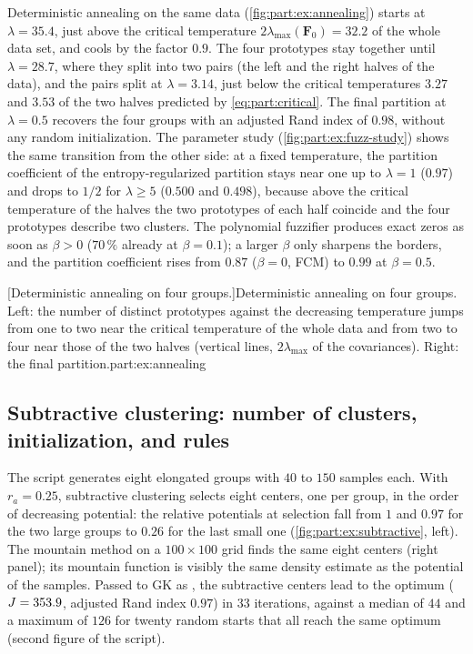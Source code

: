 Deterministic annealing on the same data (\cref{fig:part:ex:annealing}) starts at $\lambda=35.4$, just above the critical temperature $2\lambda_{\max}(\mathbf{F}_0)=32.2$ of the whole data set, and cools by the factor $0.9$. The four prototypes stay together until $\lambda=28.7$, where they split into two pairs (the left and the right halves of the data), and the pairs split at $\lambda=3.14$, just below the critical temperatures $3.27$ and $3.53$ of the two halves predicted by \eqref{eq:part:critical}. The final partition at $\lambda=0.5$ recovers the four groups with an adjusted Rand index of $0.98$, without any random initialization. The parameter study (\cref{fig:part:ex:fuzz-study}) shows the same transition from the other side: at a fixed temperature, the partition coefficient of the entropy-regularized partition stays near one up to $\lambda=1$ ($0.97$) and drops to $1/2$ for $\lambda\ge5$ ($0.500$ and $0.498$), because above the critical temperature of the halves the two prototypes of each half coincide and the four prototypes describe two clusters. The polynomial fuzzifier produces exact zeros as soon as $\beta>0$ ($70\,\%$ already at $\beta=0.1$); a larger $\beta$ only sharpens the borders, and the partition coefficient rises from $0.87$ ($\beta=0$, FCM) to $0.99$ at $\beta=0.5$.

[Deterministic annealing on four groups.]{Deterministic annealing on four groups. Left: the number of distinct prototypes against the decreasing temperature jumps from one to two near the critical temperature of the whole data and from two to four near those of the two halves (vertical lines, $2\lambda_{\max}$ of the covariances). Right: the final partition.}{part:ex:annealing}

\subsection{Subtractive clustering: number of clusters, initialization, and rules}\label{sec:part:ex:subtractive}

The script  generates eight elongated groups with $40$ to $150$ samples each. With $r_a=0.25$, subtractive clustering selects eight centers, one per group, in the order of decreasing potential: the relative potentials at selection fall from $1$ and $0.97$ for the two large groups to $0.26$ for the last small one (\cref{fig:part:ex:subtractive}, left). The mountain method on a $100\times100$ grid finds the same eight centers (right panel); its mountain function is visibly the same density estimate as the potential of the samples. Passed to GK as , the subtractive centers lead to the optimum ($J=353.9$, adjusted Rand index $0.97$) in $33$ iterations, against a median of $44$ and a maximum of $126$ for twenty random starts that all reach the same optimum (second figure of the script).

